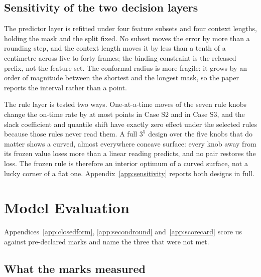 \documentclass{swmcmthesis}
\begin{document}
\subsection{Sensitivity of the two decision layers}
\label{sec:sensitivity}

The predictor layer is refitted under four feature subsets and four context
lengths, holding the mask and the split fixed. No subset moves the error
by more than a rounding step, and the context length moves it by less than a tenth of a
centimetre across five to forty frames; the binding constraint is the released prefix, not
the feature set. The conformal radius is more fragile: it grows by an order of magnitude
between the shortest and the longest mask, so the paper reports the interval rather than a
point.

The rule layer is tested two ways. One-at-a-time moves of the seven rule knobs change
the on-time rate by at most \slotPFactRangeSTwo{} points in Case S2 and
\slotPFactRangeSThree{} in Case S3, and the slack coefficient and quantile shift have
exactly zero effect under the selected rules because those rules never read them. A full
$3^5$ design over the five knobs that do matter shows a curved, almost everywhere concave
surface: every knob away from its frozen value loses more than a linear reading predicts,
and no pair restores the loss. The frozen rule is therefore an interior optimum of a curved
surface, not a lucky corner of a flat one. Appendix~\ref{app:sensitivity} reports both
designs in full.

\section{Model Evaluation}
\label{sec:eval}

Appendices~\ref{app:closedform}, \ref{app:secondround} and~\ref{app:scorecard} score us
against pre-declared marks and name the three that were not met.

\subsection{What the marks measured}
\end{document}
